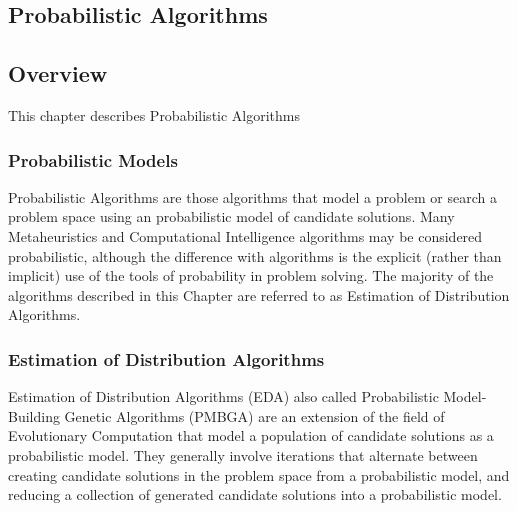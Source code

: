 

\renewcommand{\bibsection}{\subsection{\bibname}}
\begin{bibunit}

\chapter{Probabilistic Algorithms}
\label{ch:probabilistic}

\section{Overview}
This chapter describes Probabilistic Algorithms


\subsection{Probabilistic Models}
Probabilistic Algorithms are those algorithms that model a problem or search a problem space using an probabilistic model of candidate solutions. Many Metaheuristics and Computational Intelligence algorithms may be considered probabilistic, although the difference with algorithms is the explicit (rather than implicit) use of the tools of probability in problem solving. The majority of the algorithms described in this Chapter are referred to as Estimation of Distribution Algorithms.

\subsection{Estimation of Distribution Algorithms}
Estimation of Distribution Algorithms (EDA) also called Probabilistic Model-Building Genetic Algorithms (PMBGA) are an extension of the field of Evolutionary Computation that model a population of candidate solutions as a probabilistic model. They generally involve iterations that alternate between creating candidate solutions in the problem space from a probabilistic model, and reducing a collection of generated candidate solutions into a probabilistic model.


\end{bibunit}
